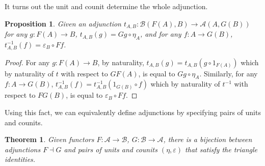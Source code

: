 \documentclass[11pt]{article}
\theoremstyle{definition}
\theoremstyle{definition}
\theoremstyle{plain}
\newtheorem{theo}{Theorem}
\theoremstyle{plain}
\newtheorem{prop}{Proposition}
\theoremstyle{plain}
\begin{document}
It turns out the unit and counit determine the whole adjunction.

\begin{prop}
Given an adjunction $t_{A,B}:\mathscr{B}(F(A),B) \to \mathscr{A}(A,G(B))$ for any $g:F(A) \to B$, $t_{A,B}(g)=Gg \circ \eta_{A}$, and for any $f:A \to G(B)$, $t^{-1}_{A,B}(f)=\varepsilon_{B} \circ Ff$.
\end{prop}

\begin{proof}
For any $g:F(A) \to B$, by naturality, $t_{A,B}(g)=t_{A,B}(g \circ 1_{F(A)})$ which by naturality of $t$ with respect to $GF(A)$, is equal to $Gg \circ \eta_{A}$. Similarly, for any $f:A \to G(B)$, $t^{-1}_{A,B}(f) = t^{-1}_{A,B}(1_{G(B)} \circ f)$ which by naturality of $t^{-1}$ with respect to $FG(B)$, is equal to $\varepsilon_{B} \circ Ff$.
\end{proof}

Using this fact, we can equivalently define adjunctions by specifying pairs of units and counits.

\begin{theo}
Given functors $F:\mathscr{A} \to \mathscr{B}$, $G: \mathscr{B} \to \mathscr{A}$, there is a bijection between adjunctions $F \dashv G$ and pairs of units and counits $(\eta, \varepsilon)$ that satisfy the triangle identities.
\end{theo}
\end{document}
